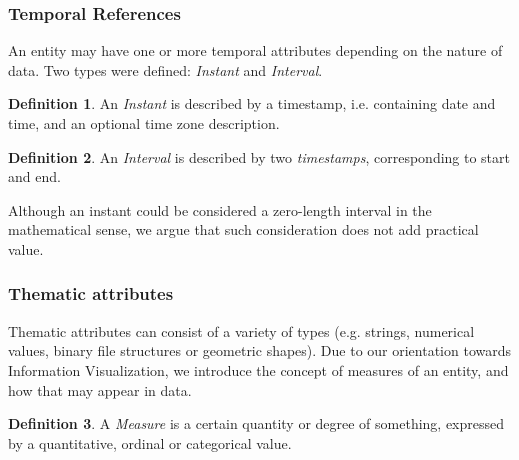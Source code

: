 \documentclass[]{interact}
\theoremstyle{plain}%
\theoremstyle{definition}
\theoremstyle{remark}
\theoremstyle{definition}
\newtheorem{defn}{Definition}[section]
\begin{document}
\subsubsection{Temporal References}\label{sec:temporalreferences}

An entity may have one or more temporal attributes depending on the nature of data. Two types were defined: \emph{Instant} and \emph{Interval}.

\begin{defn}
An \emph{Instant} is described by a timestamp, i.e. containing date and time, and an optional time zone description.
\end{defn}

\begin{defn}
An \emph{Interval} is described by two \emph{timestamps}, corresponding to start and end.
\end{defn}

Although an instant could be considered a zero-length interval in the mathematical sense, we argue that such consideration does not add practical value.

\subsubsection{Thematic attributes}\label{sec:thematicattributes}

Thematic attributes can consist of a variety of types (e.g. strings, numerical values, binary file structures or geometric shapes). Due to our orientation towards Information Visualization, we introduce the concept of measures of an entity, and how that may appear in data.

\begin{defn}
A \emph{Measure} is a certain quantity or degree of something, expressed by a quantitative, ordinal or categorical value.
\end{defn}

%
%
\end{document}
